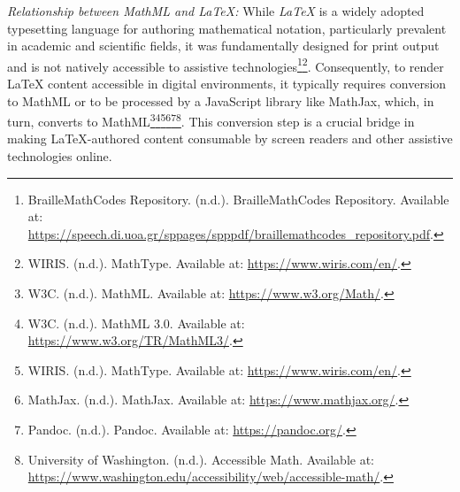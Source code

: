 \emph{Relationship between MathML and LaTeX:} While \emph{LaTeX} is a widely adopted typesetting language for authoring mathematical notation, particularly prevalent in academic and scientific fields, it was fundamentally designed for print output and is not natively accessible to assistive technologies\footnote{BrailleMathCodes Repository. (n.d.). BrailleMathCodes Repository. Available at: \url{https://speech.di.uoa.gr/sppages/spppdf/braillemathcodes_repository.pdf}.}\footnote{WIRIS. (n.d.). MathType. Available at: \url{https://www.wiris.com/en/}.}. Consequently, to render LaTeX content accessible in digital environments, it typically requires conversion to MathML or to be processed by a JavaScript library like MathJax, which, in turn, converts to MathML\footnote{W3C. (n.d.). MathML. Available at: \url{https://www.w3.org/Math/}.}\footnote{W3C. (n.d.). MathML 3.0. Available at: \url{https://www.w3.org/TR/MathML3/}.}\footnote{WIRIS. (n.d.). MathType. Available at: \url{https://www.wiris.com/en/}.}\footnote{MathJax. (n.d.). MathJax. Available at: \url{https://www.mathjax.org/}.}\footnote{Pandoc. (n.d.). Pandoc. Available at: \url{https://pandoc.org/}.}\footnote{University of Washington. (n.d.). Accessible Math. Available at: \url{https://www.washington.edu/accessibility/web/accessible-math/}.}. This conversion step is a crucial bridge in making LaTeX-authored content consumable by screen readers and other assistive technologies online.

